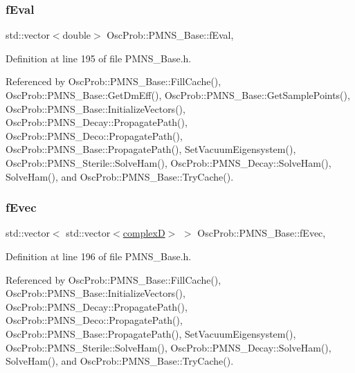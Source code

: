 \subsubsection{\texorpdfstring{f\+Eval}{fEval}}
{\footnotesize\ttfamily std\+::vector$<$double$>$ Osc\+Prob\+::\+P\+M\+N\+S\+\_\+\+Base\+::f\+Eval\hspace{0.3cm}{\ttfamily [protected]}, {\ttfamily [inherited]}}



Definition at line 195 of file P\+M\+N\+S\+\_\+\+Base.\+h.



Referenced by Osc\+Prob\+::\+P\+M\+N\+S\+\_\+\+Base\+::\+Fill\+Cache(), Osc\+Prob\+::\+P\+M\+N\+S\+\_\+\+Base\+::\+Get\+Dm\+Eff(), Osc\+Prob\+::\+P\+M\+N\+S\+\_\+\+Base\+::\+Get\+Sample\+Points(), Osc\+Prob\+::\+P\+M\+N\+S\+\_\+\+Base\+::\+Initialize\+Vectors(), Osc\+Prob\+::\+P\+M\+N\+S\+\_\+\+Decay\+::\+Propagate\+Path(), Osc\+Prob\+::\+P\+M\+N\+S\+\_\+\+Deco\+::\+Propagate\+Path(), Osc\+Prob\+::\+P\+M\+N\+S\+\_\+\+Base\+::\+Propagate\+Path(), Set\+Vacuum\+Eigensystem(), Osc\+Prob\+::\+P\+M\+N\+S\+\_\+\+Sterile\+::\+Solve\+Ham(), Osc\+Prob\+::\+P\+M\+N\+S\+\_\+\+Decay\+::\+Solve\+Ham(), Solve\+Ham(), and Osc\+Prob\+::\+P\+M\+N\+S\+\_\+\+Base\+::\+Try\+Cache().

\mbox{\label{classOscProb_1_1PMNS__Base_a87be137356c5f27ab83cab5e1298ef8f}} 
\subsubsection{\texorpdfstring{f\+Evec}{fEvec}}
{\footnotesize\ttfamily std\+::vector$<$ std\+::vector$<$\hyperlink{EigenPoint_8h_a67ca8e107e20610c3fff78d5e726ece0}{complexD}$>$ $>$ Osc\+Prob\+::\+P\+M\+N\+S\+\_\+\+Base\+::f\+Evec\hspace{0.3cm}{\ttfamily [protected]}, {\ttfamily [inherited]}}



Definition at line 196 of file P\+M\+N\+S\+\_\+\+Base.\+h.



Referenced by Osc\+Prob\+::\+P\+M\+N\+S\+\_\+\+Base\+::\+Fill\+Cache(), Osc\+Prob\+::\+P\+M\+N\+S\+\_\+\+Base\+::\+Initialize\+Vectors(), Osc\+Prob\+::\+P\+M\+N\+S\+\_\+\+Decay\+::\+Propagate\+Path(), Osc\+Prob\+::\+P\+M\+N\+S\+\_\+\+Deco\+::\+Propagate\+Path(), Osc\+Prob\+::\+P\+M\+N\+S\+\_\+\+Base\+::\+Propagate\+Path(), Set\+Vacuum\+Eigensystem(), Osc\+Prob\+::\+P\+M\+N\+S\+\_\+\+Sterile\+::\+Solve\+Ham(), Osc\+Prob\+::\+P\+M\+N\+S\+\_\+\+Decay\+::\+Solve\+Ham(), Solve\+Ham(), and Osc\+Prob\+::\+P\+M\+N\+S\+\_\+\+Base\+::\+Try\+Cache().

